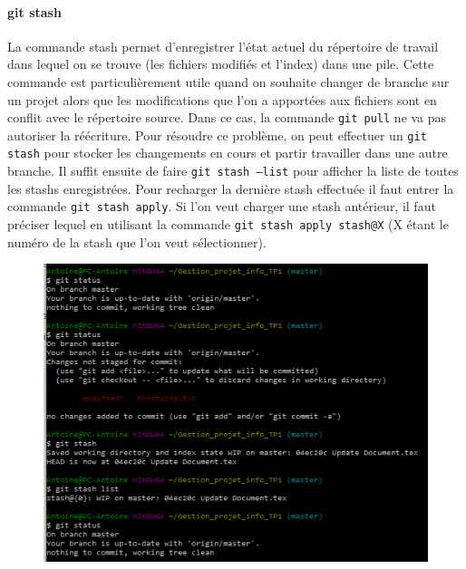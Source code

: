 \documentclass[11pt,canadien]{article}
\begin{document}
\paragraph{git stash}La commande stash permet d'enregistrer l'état actuel du répertoire de travail dans lequel on se trouve (les fichiers modifiés et l'index) dans une pile. Cette commande est particulièrement utile quand on souhaite changer de branche sur un projet alors que les modifications que l'on a apportées aux fichiers sont en conflit avec le répertoire source. Dans ce cas, la commande \texttt{git pull} ne va pas autoriser la réécriture. Pour résoudre ce problème, on peut effectuer un \texttt{git stash} pour stocker les changements en cours et partir travailler dans une autre branche. Il suffit ensuite de faire \texttt{git stash --list} pour afficher la liste de toutes les stashs enregistrées. Pour recharger la dernière stash effectuée il faut entrer la commande \texttt{git stash apply}. Si l'on veut charger une stash antérieur, il faut préciser lequel en utilisant la commande \texttt{git stash apply stash@{X}} (X étant le numéro de la stash que l'on veut sélectionner).
\begin{figure}[H]
	\centering
	\includegraphics{images/git_stash.png}
\end{figure}
\end{document}
